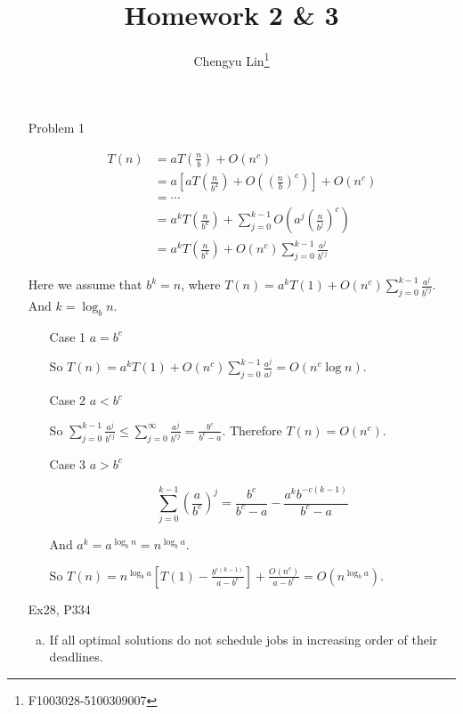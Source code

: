 \documentclass{article}
\title{Homework 2 \& 3}
\author{Chengyu Lin\footnote{F1003028-5100309007}}
\date{}
\begin{document}
\maketitle

\begin{itemize}
    \item[Problem 1]

        \begin{align*}
            T(n) &= a T(\frac{n}{b}) + O(n^c) \\
                 &= a [a T(\frac{n}{b^2}) + O((\frac{n}{b})^c)] + O(n^c) \\
                 &= \cdots \\
                 &= a^k T(\frac{n}{b^k}) + \sum_{j = 0}^{k - 1} O(a^j (\frac{n}{b^j})^c) \\
                 &= a^k T(\frac{n}{b^k}) + O(n^c) \sum_{j = 0}^{k - 1} \frac{a^j}{b^{cj}}
        \end{align*}

        Here we assume that $b^k = n$, where $T(n) = a^k T(1) + O(n^c) \sum_{j = 0}^{k - 1} \frac{a^j}{b^{cj}}$.
        And $k = \log_b n$.

        \begin{enumerate}
            \item [Case 1]
                $a = b^c$

                So $T(n) = a^k T(1) + O(n^c) \sum_{j = 0} ^ {k - 1} \frac{a^j}{a^j} = O(n^c \log n)$.
            \item [Case 2]
                $a < b^c$

                So $\sum_{j = 0}^{k - 1} \frac{a^j}{b^{cj}} \le \sum_{j = 0}^{\infty} \frac{a^j}{b^{cj}} = \frac{b^c}{b^c - a}$.
                Therefore $T(n) = O(n^c)$.
            \item [Case 3]
                $a > b^c$

                $$\sum_{j = 0}^{k - 1} (\frac{a}{b^c})^j = \frac{b^c}{b^c - a} - \frac{a^k b^{-c(k-1)}}{b^c - a}$$

                And $a^k = a^{\log_b n} = n^{\log_b a}$.

                So $T(n) = n^{\log_b a}[T(1) - \frac{b^{c(k - 1)}}{a - b^c}] + \frac{O(n^c)}{a - b^c} = O(n^{\log_b a})$.
        \end{enumerate}
            

    \item[Ex28, P334]

        \begin{enumerate}[(a)]
            \item
                If all optimal solutions do not schedule jobs in increasing order
                of their deadlines. 
                

\end{enumerate}
\end{itemize}
\end{document}
